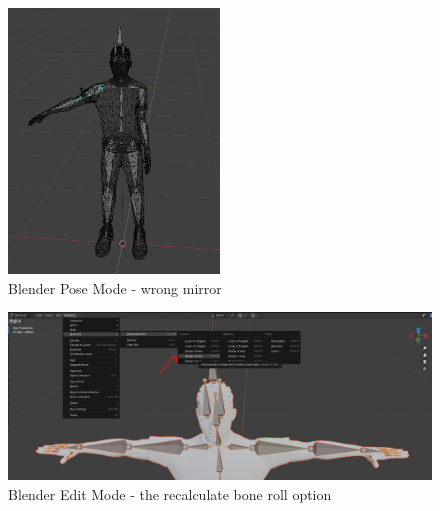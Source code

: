 \documentclass{uva-inf-article}
\begin{document}
\begin{figure}[hbt!]
    \centering
    \includegraphics[width=0.5\textwidth]{imgs/wrongMirrorMode.png}
    \caption{Blender Pose Mode - wrong mirror}
    \label{fig:mirrorWrong}
\end{figure}
\begin{figure}[hbt!]
    \centering
    \includegraphics[width=1\textwidth]{imgs/resetRoll.png}
    \caption{Blender Edit Mode - the recalculate bone roll option}
    \label{fig:recalcboneroll}
\end{figure}
\end{document}
